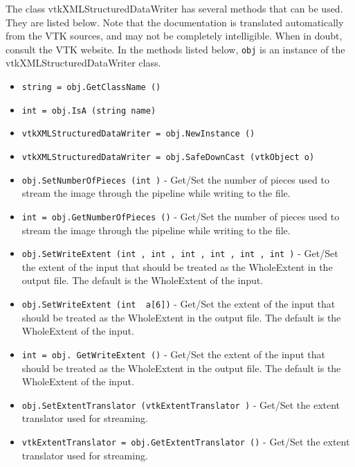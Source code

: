 The class vtkXMLStructuredDataWriter has several methods that can be used.
  They are listed below.
Note that the documentation is translated automatically from the VTK sources,
and may not be completely intelligible.  When in doubt, consult the VTK website.
In the methods listed below, \verb|obj| is an instance of the vtkXMLStructuredDataWriter class.
\begin{itemize}
\item  \verb|string = obj.GetClassName ()|

\item  \verb|int = obj.IsA (string name)|

\item  \verb|vtkXMLStructuredDataWriter = obj.NewInstance ()|

\item  \verb|vtkXMLStructuredDataWriter = obj.SafeDownCast (vtkObject o)|

\item  \verb|obj.SetNumberOfPieces (int )| -  Get/Set the number of pieces used to stream the image through the
 pipeline while writing to the file.

\item  \verb|int = obj.GetNumberOfPieces ()| -  Get/Set the number of pieces used to stream the image through the
 pipeline while writing to the file.

\item  \verb|obj.SetWriteExtent (int , int , int , int , int , int )| -  Get/Set the extent of the input that should be treated as the
 WholeExtent in the output file.  The default is the WholeExtent
 of the input.

\item  \verb|obj.SetWriteExtent (int  a[6])| -  Get/Set the extent of the input that should be treated as the
 WholeExtent in the output file.  The default is the WholeExtent
 of the input.

\item  \verb|int = obj. GetWriteExtent ()| -  Get/Set the extent of the input that should be treated as the
 WholeExtent in the output file.  The default is the WholeExtent
 of the input.

\item  \verb|obj.SetExtentTranslator (vtkExtentTranslator )| -  Get/Set the extent translator used for streaming.

\item  \verb|vtkExtentTranslator = obj.GetExtentTranslator ()| -  Get/Set the extent translator used for streaming.

\end{itemize}
